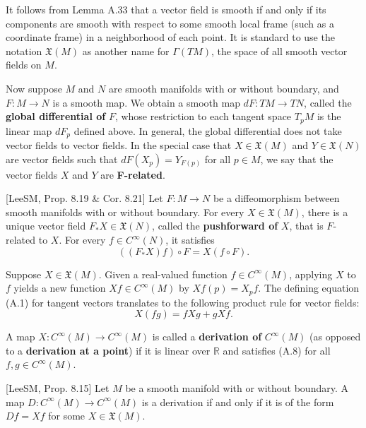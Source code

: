 It follows from Lemma A.33 that a vector field is smooth if and only if its components are smooth with respect to some smooth local frame (such as a coordinate frame) in a neighborhood of each point. It is standard to use the notation $\mathfrak{X}(M)$ as another name for $\Gamma(TM)$, the space of all smooth vector fields on $M$.

Now suppose $M$ and $N$ are smooth manifolds with or without boundary, and $F : M \to N$ is a smooth map. We obtain a smooth map $dF : TM \to TN$, called the \textbf{global differential of } $F$, whose restriction to each tangent space $T_p M$ is the linear map $dF_p$ defined above. In general, the global differential does not take vector fields to vector fields. In the special case that $X \in \mathfrak{X}(M)$ and $Y \in \mathfrak{X}(N)$ are vector fields such that $dF(X_p) = Y_{F(p)}$ for all $p \in M$, we say that the vector fields $X$ and $Y$ are \textbf{F-related}.

\begin{lemma}
\label{lem:pushforward-vector-field}
[LeeSM, Prop. 8.19 \& Cor. 8.21] Let $F : M \to N$ be a diffeomorphism between smooth manifolds with or without boundary. For every $X \in \mathfrak{X}(M)$, there is a unique vector field $F_* X \in \mathfrak{X}(N)$, called the \textbf{pushforward of } $X$, that is $F$-related to $X$. For every $f \in C^\infty(N)$, it satisfies
\begin{equation}
((F_* X)f) \circ F = X(f \circ F).
\tag{A.7}
\end{equation}
\end{lemma}

Suppose $X \in \mathfrak{X}(M)$. Given a real-valued function $f \in C^\infty(M)$, applying $X$ to $f$ yields a new function $Xf \in C^\infty(M)$ by $Xf(p) = X_p f$. The defining equation (A.1) for tangent vectors translates to the following product rule for vector fields:
\begin{equation}
X(fg) = f Xg + g Xf.
\tag{A.8}
\end{equation}

A map $X : C^\infty(M) \to C^\infty(M)$ is called a \textbf{derivation of } $C^\infty(M)$ (as opposed to a \textbf{derivation at a point}) if it is linear over $\mathbb{R}$ and satisfies (A.8) for all $f, g \in C^\infty(M)$.

\begin{lemma}
\label{lem:derivation-characterization}
[LeeSM, Prop. 8.15] Let $M$ be a smooth manifold with or without boundary. A map $D : C^\infty(M) \to C^\infty(M)$ is a derivation if and only if it is of the form $Df = Xf$ for some $X \in \mathfrak{X}(M)$.
\end{lemma}

